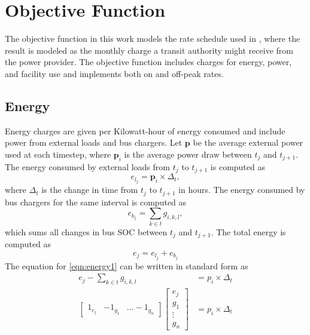 \section{Objective Function}
The objective function in this work models the rate schedule used in \cite{noauthor_rocky_nodate}, where the result is modeled as the monthly charge a transit authority might receive from the power provider. The objective function includes charges for energy, power, and facility use and implements both on and off-peak rates.
\subsection{Energy}
\par Energy charges are given per Kilowatt-hour of energy consumed and include power from external loads and bus chargers. Let $\mathbf{p}$ be the average external power used at each timestep, where $\mathbf{p}_i$ is the average power draw between $t_j$ and $t_{j + 1}$. The energy consumed by external loads from $t_j$ to $t_{j+1}$ is computed as 
\begin{equation}
	e_{l_j} = \mathbf{p}_i \times \Delta_t,
\end{equation}
where $\Delta_t$ is the change in time from $t_j$ to $t_{j+1}$ in hours. The energy consumed by bus chargers for the same interval is computed as  
\begin{equation}
	e_{b_j} = \sum_{k\in t}g_{i,k,l},	
\end{equation}
which sums all changes in bus SOC between $t_j$ and $t_{j+1}$.
The total energy is computed as 
\begin{equation}\label{eqn:energy1}
	e_j = e_{l_j} + e_{b_j}
\end{equation}
The equation for \ref{eqn:energy1} can be written in standard form as 
\begin{equation}\label{eqn:energy2}
	\begin{aligned}
		e_j -\sum_{k\in t}g_{i,k,l} &= p_i \times \Delta_t \\
		\begin{bmatrix} 1_{e_j} & -1_{g_1} & \hdots -1_{g_n} \end{bmatrix} \begin{bmatrix}e_j \\ g_1 \\ \vdots \\ g_n \end{bmatrix} &= p_i \times \Delta_t
	\end{aligned}
\end{equation}
